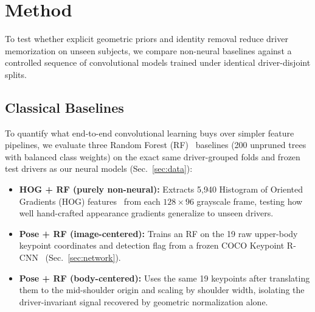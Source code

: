 \section{Method}
\label{sec:method}


To test whether explicit geometric priors and identity removal reduce driver memorization on unseen subjects, we compare non-neural baselines against a controlled sequence of convolutional models trained under identical driver-disjoint splits.

\subsection{Classical Baselines}
To quantify what end-to-end convolutional learning buys over simpler feature pipelines, we evaluate three Random Forest (RF)~\cite{breiman2001rf} baselines (200 unpruned trees with balanced class weights) on the exact same driver-grouped folds and frozen test drivers as our neural models (Sec.~\ref{sec:data}):
\begin{itemize}[leftmargin=*,nosep]
  \item \textbf{HOG + RF (purely non-neural):} Extracts 5,940 Histogram of Oriented Gradients (HOG) features~\cite{dalal2005hog} from each $128 \times 96$ grayscale frame, testing how well hand-crafted appearance gradients generalize to unseen drivers.
  \item \textbf{Pose + RF (image-centered):} Trains an RF on the 19 raw upper-body keypoint coordinates and detection flag from a frozen COCO Keypoint R-CNN~\cite{he2017maskrcnn} (Sec.~\ref{sec:network}).
  \item \textbf{Pose + RF (body-centered):} Uses the same 19 keypoints after translating them to the mid-shoulder origin and scaling by shoulder width, isolating the driver-invariant signal recovered by geometric normalization alone.
\end{itemize}

